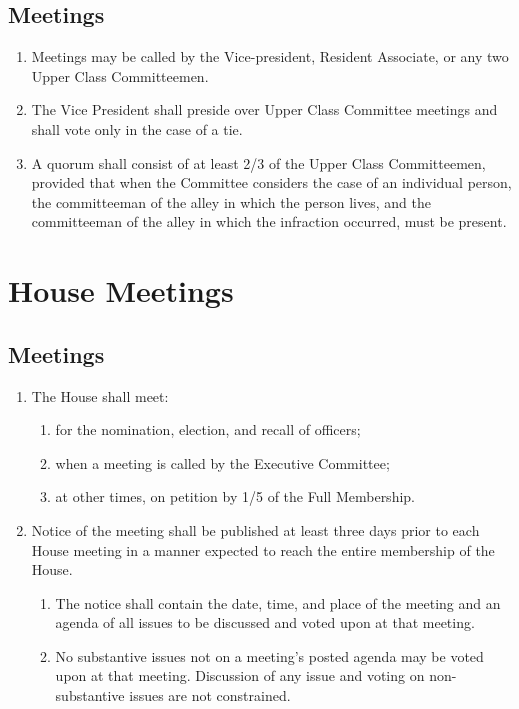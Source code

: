 \documentclass[10pt]{article} %
\begin{document}
\subsection{Meetings}
\begin{enumerate}
\item Meetings may be called by the Vice-president, Resident Associate, or any two Upper Class Committeemen.
\item The Vice President shall preside over Upper Class Committee meetings and shall vote only in the case of a tie.
\item A quorum shall consist of at least 2/3 of the Upper Class Committeemen, provided that when the Committee considers the case of an individual person, the committeeman of the alley in which the person lives, and the committeeman of the alley in which the infraction occurred, must be present.
\end{enumerate}
\section{House Meetings}
\subsection{Meetings}
\begin{enumerate}
\item The House shall meet:
\begin{enumerate}
\item for the nomination, election, and recall of officers;
\item when a meeting is called by the Executive Committee;
\item at other times, on petition by 1/5 of the Full Membership.
\end{enumerate}
\item Notice of the meeting shall be published at least three days prior to each House meeting in a manner expected to reach the entire membership of the House.
\begin{enumerate}
\item The notice shall contain the date, time, and place of the meeting and an agenda of all issues to be discussed and voted upon at that meeting.
\item No substantive issues not on a meeting’s posted agenda may be voted upon at that meeting. Discussion of any issue and voting on non-substantive issues are not constrained.
\end{enumerate}
\end{enumerate}
\end{document}
